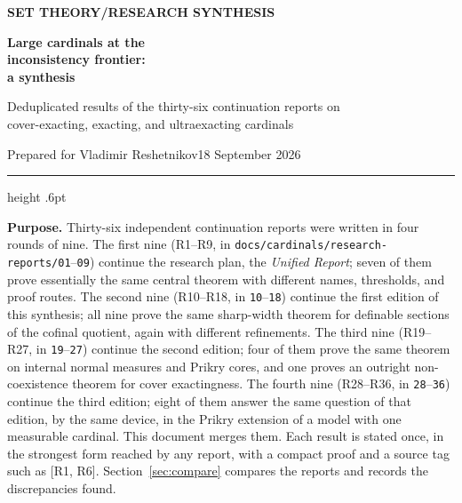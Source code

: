 \documentclass[11pt,letterpaper]{article}
\theoremstyle{definition}
\numberwithin{equation}{section}
\newcommand{\R}[1]{\textsf{R#1}}
\begin{document}
\thispagestyle{empty}
{\sffamily\bfseries\small\color{Olive}SET THEORY\quad /\quad RESEARCH SYNTHESIS}

\vspace{13pt}
{\fontsize{28}{31}\selectfont\bfseries\color{Forest}Large cardinals at the\\ inconsistency frontier:\\ a synthesis\par}
\vspace{10pt}
{\fontsize{14}{18}\selectfont Deduplicated results of the thirty-six continuation reports on\\ cover-exacting, exacting, and ultraexacting cardinals\par}
\vspace{14pt}
{\color{Muted}Prepared for Vladimir Reshetnikov\hfill 18 September 2026\par}
\vspace{3pt}
{\color{Sage}\hrule height .6pt}
\vspace{12pt}

\textbf{Purpose.} Thirty-six independent continuation reports were written in four rounds of nine. The first nine (\R1--\R9, in \nolinkurl{docs/cardinals/research-reports/01}--\nolinkurl{09}) continue the research plan, the \emph{Unified Report}; seven of them prove essentially the same central theorem with different names, thresholds, and proof routes. The second nine (\R{10}--\R{18}, in \nolinkurl{10}--\nolinkurl{18}) continue the first edition of this synthesis; all nine prove the same sharp-width theorem for definable sections of the cofinal quotient, again with different refinements. The third nine (\R{19}--\R{27}, in \nolinkurl{19}--\nolinkurl{27}) continue the second edition; four of them prove the same theorem on internal normal measures and Prikry cores, and one proves an outright non-coexistence theorem for cover exactingness. The fourth nine (\R{28}--\R{36}, in \nolinkurl{28}--\nolinkurl{36}) continue the third edition; eight of them answer the same question of that edition, by the same device, in the Prikry extension of a model with one measurable cardinal. This document merges them. Each result is stated once, in the strongest form reached by any report, with a compact proof and a source tag such as {\small\sffamily\color{Olive}[R1, R6]}. Section~\ref{sec:compare} compares the reports and records the discrepancies found.
\end{document}
